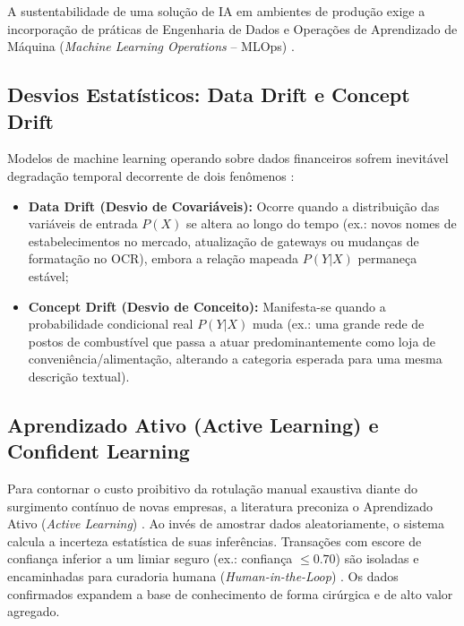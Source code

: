 \documentclass[
	12pt,				
	openright,			
	oneside,			
	a4paper,			
	english,			
	brazil				
	]{abntex2}
\begin{document}
A sustentabilidade de uma solução de IA em ambientes de produção exige a incorporação de práticas de Engenharia de Dados e Operações de Aprendizado de Máquina (\textit{Machine Learning Operations} -- MLOps) \cite{kreuzberger2022mlops, treveil2020mlops}.

\subsection{Desvios Estatísticos: Data Drift e Concept Drift}
Modelos de machine learning operando sobre dados financeiros sofrem inevitável degradação temporal decorrente de dois fenômenos \cite{quinonero2008dataset, Lu2019LearningConceptDriftReview}:
\begin{itemize}
    \item \textbf{Data Drift (Desvio de Covariáveis):} Ocorre quando a distribuição das variáveis de entrada $P(X)$ se altera ao longo do tempo (ex.: novos nomes de estabelecimentos no mercado, atualização de gateways ou mudanças de formatação no OCR), embora a relação mapeada $P(Y|X)$ permaneça estável;
    \item \textbf{Concept Drift (Desvio de Conceito):} Manifesta-se quando a probabilidade condicional real $P(Y|X)$ muda (ex.: uma grande rede de postos de combustível que passa a atuar predominantemente como loja de conveniência/alimentação, alterando a categoria esperada para uma mesma descrição textual).
\end{itemize}

\subsection{Aprendizado Ativo (Active Learning) e Confident Learning}
Para contornar o custo proibitivo da rotulação manual exaustiva diante do surgimento contínuo de novas empresas, a literatura preconiza o Aprendizado Ativo (\textit{Active Learning}) \cite{ren2021aprendizagem}. Ao invés de amostrar dados aleatoriamente, o sistema calcula a incerteza estatística de suas inferências. Transações com escore de confiança inferior a um limiar seguro (ex.: confiança $\le 0.70$) são isoladas e encaminhadas para curadoria humana (\textit{Human-in-the-Loop}) \cite{northcutt2021aprendizagem}. Os dados confirmados expandem a base de conhecimento de forma cirúrgica e de alto valor agregado.
\end{document}
